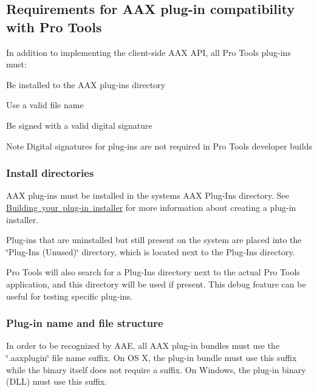  \hypertarget{a00830_aax_pro_tools_guide_02_requirements_for_aax_plugin_compatibility_with_pro_tools}{}\subsection{Requirements for A\+A\+X plug-\/in compatibility with Pro Tools}\label{a00830_aax_pro_tools_guide_02_requirements_for_aax_plugin_compatibility_with_pro_tools}
 In addition to implementing the client-\/side A\+AX A\+PI, all Pro Tools plug-\/ins must\+: 
\begin{DoxyEnumerate}
\item Be installed to the A\+AX plug-\/ins directory  
\item Use a valid file name 
\item Be signed with a valid digital signature \begin{DoxyNote}{Note}
Digital signatures for plug-\/ins are not required in Pro Tools developer builds  
\end{DoxyNote}

\end{DoxyEnumerate}

\hypertarget{a00830_subsection__install_directories_}{}\subsubsection{Install directories}\label{a00830_subsection__install_directories_}
 A\+AX plug-\/ins must be installed in the system\textquotesingle{}s A\+AX Plug-\/\+Ins directory. See \mbox{\hyperlink{a00843_aax_distributing_installer}{Building your plug-\/in installer}} for more information about creating a plug-\/in installer.

Plug-\/ins that are uninstalled but still present on the system are placed into the \char`\"{}\+Plug-\/\+Ins (\+Unused)\char`\"{} directory, which is located next to the Plug-\/\+Ins directory.

Pro Tools will also search for a Plug-\/\+Ins directory next to the actual Pro Tools application, and this directory will be used if present. This debug feature can be useful for testing specific plug-\/ins.

\hypertarget{a00830_subsection__file_name_}{}\subsubsection{Plug-\/in name and file structure}\label{a00830_subsection__file_name_}
 In order to be recognized by A\+AE, all A\+AX plug-\/in bundles must use the \char`\"{}.\+aaxplugin\char`\"{} file name suffix. On OS X, the plug-\/in bundle must use this suffix while the binary itself does not require a suffix. On Windows, the plug-\/in binary (D\+LL) must use this suffix.

